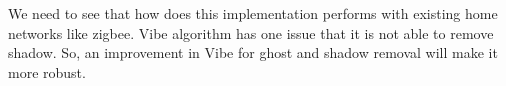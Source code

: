 \documentclass[conference]{IEEEtran}
\begin{document}
We need to see that how does this implementation performs with existing home
networks like zigbee. Vibe algorithm has one issue that it is not able to
remove shadow. So, an improvement in Vibe for ghost and shadow removal
will make it more robust.


%
%



%
%
\end{document}
